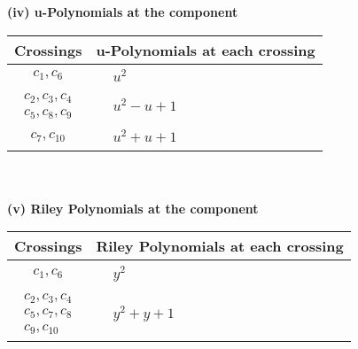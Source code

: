 \documentclass[1p]{elsarticle_modified}
\theoremstyle{definition}
\begin{document}
\newpage\renewcommand{\arraystretch}{1}
\flushleft \textbf{(iv) u-Polynomials at the component}\newline \\
\begin{tabular}{m{50pt}|m{274pt}}
Crossings & \hspace{64pt}u-Polynomials at each crossing \\
\hline $$\begin{aligned}c_{1},c_{6}\end{aligned}$$&$\begin{aligned}
&u^2
\end{aligned}$\\
\hline $$\begin{aligned}c_{2},c_{3},c_{4}\\c_{5},c_{8},c_{9}\end{aligned}$$&$\begin{aligned}
&u^2- u+1
\end{aligned}$\\
\hline $$\begin{aligned}c_{7},c_{10}\end{aligned}$$&$\begin{aligned}
&u^2+u+1
\end{aligned}$\\
\hline
\end{tabular}\\~\\
\newpage\renewcommand{\arraystretch}{1}
\flushleft \textbf{(v) Riley Polynomials at the component}\newline \\
\begin{tabular}{m{50pt}|m{274pt}}
Crossings & \hspace{64pt}Riley Polynomials at each crossing \\
\hline $$\begin{aligned}c_{1},c_{6}\end{aligned}$$&$\begin{aligned}
&y^2
\end{aligned}$\\
\hline $$\begin{aligned}c_{2},c_{3},c_{4}\\c_{5},c_{7},c_{8}\\c_{9},c_{10}\end{aligned}$$&$\begin{aligned}
&y^2+y+1
\end{aligned}$\\
\hline
\end{tabular}\\~\\
\end{document}
